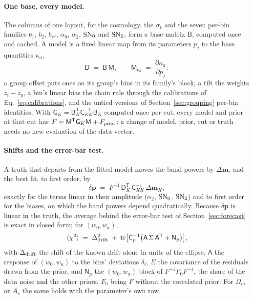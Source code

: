 \documentclass[11pt]{article}
\newcommand{\bstwo}{b_{s^2}}
\newcommand{\SNz}{{\rm SN}_0}
\newcommand{\SNt}{{\rm SN}_2}
\newcommand{\T}{^{\mathsf{T}}}
\begin{document}
\paragraph{One base, every model.}
The columns of one layout, for the cosmology, the $\sigma_v$ and the
seven per-bin families $b_1$, $b_2$, $\bstwo$, $\alpha_0$, $\alpha_2$,
$\SNz$ and $\SNt$, form a base matrix $\mathsf{B}$, computed once and
cached.  A model is a fixed linear map from its parameters $p_j$ to the
base quantities $\kappa_a$,
\begin{equation}
  \mathsf{D} \;=\; \mathsf{B}\,\mathsf{M} ,
  \qquad
  \mathsf{M}_{aj} \;=\; \frac{\partial\kappa_a}{\partial p_j} :
  \label{eq:dbm}
\end{equation}
a group offset puts ones on its group's bins in its family's block, a
tilt the weights $\bar{z}_i - \bar{z}_g$, a bin's linear bias the chain
rule through the calibrations of Eq.~\eqref{eq:calibrations}, and the
untied versions of Section~\ref{sec:grouping} per-bin identities.  With
$\mathsf{G}_K = \mathsf{B}_K\T\mathsf{C}_{KK}^{-1}\mathsf{B}_K$ computed
once per cut, every model and prior at that cut has
$F = \mathsf{M}\T\mathsf{G}_K\mathsf{M} + F_{\rm prior}$: a change of
model, prior, cut or truth needs no new evaluation of the data vector.

\paragraph{Shifts and the error-bar test.}
A truth that departs from the fitted model moves the band powers by
$\Delta\mathbf{m}$, and the best fit, to first order, by
\begin{equation}
  \delta\mathbf{p} \;=\; F^{-1}\,\mathsf{D}_K\T\,\mathsf{C}_{KK}^{-1}\,
  \Delta\mathbf{m}_K ,
  \label{eq:shift}
\end{equation}
exactly for the terms linear in their amplitude ($\alpha_2$, $\SNz$,
$\SNt$) and to first order for the biases, on which the band powers
depend quadratically.  Because $\delta\mathbf{p}$ is linear in the
truth, the average behind the error-bar test of
Section~\ref{sec:forecast} is exact in closed form; for
$(w_0, w_a)$,
\begin{equation}
  \langle\chi^2\rangle \;=\; \Delta_{\rm drift}^2
  \;+\; {\rm tr}\bigl[\mathsf{C}_p^{-1}\bigl(\mathsf{A}\,\Sigma\,
  \mathsf{A}\T + \mathsf{N}_p\bigr)\bigr] ,
  \label{eq:chi2}
\end{equation}
with $\Delta_{\rm drift}$ the shift of the known drift alone in units
of the ellipse, $\mathsf{A}$ the response of $(w_0, w_a)$ to the bins'
deviations $\delta_i$, $\Sigma$ the covariance of the residuals drawn
from the prior, and $\mathsf{N}_p$ the $(w_0, w_a)$ block of
$F^{-1}F_0F^{-1}$, the share of the data noise and the other priors,
$F_0$ being $F$ without the correlated prior.  For $\Omega_m$ or $A_s$
the same holds with the parameter's own row.
\end{document}
